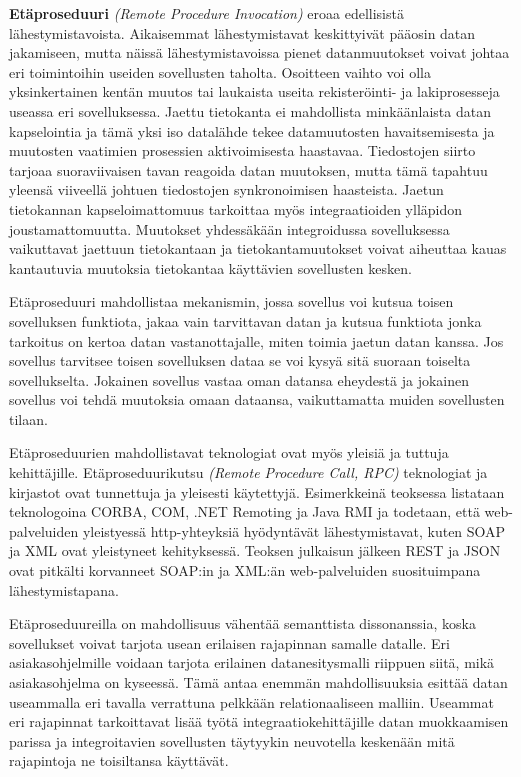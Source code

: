 \textbf{Etäproseduuri} \textit{(Remote Procedure Invocation)} eroaa edellisistä lähestymistavoista. Aikaisemmat lähestymistavat keskittyivät pääosin datan jakamiseen, mutta näissä lähestymistavoissa pienet datanmuutokset voivat johtaa eri toimintoihin useiden sovellusten taholta. Osoitteen vaihto voi olla yksinkertainen kentän muutos tai laukaista useita rekisteröinti- ja lakiprosesseja useassa eri sovelluksessa. Jaettu tietokanta ei mahdollista minkäänlaista datan kapselointia ja tämä yksi iso datalähde tekee datamuutosten havaitsemisesta ja muutosten vaatimien prosessien aktivoimisesta haastavaa. Tiedostojen siirto tarjoaa suoraviivaisen tavan reagoida datan muutoksen, mutta tämä tapahtuu yleensä viiveellä johtuen tiedostojen synkronoimisen haasteista.
Jaetun tietokannan kapseloimattomuus tarkoittaa myös integraatioiden ylläpidon joustamattomuutta. Muutokset yhdessäkään integroidussa sovelluksessa vaikuttavat jaettuun tietokantaan ja tietokantamuutokset voivat aiheuttaa kauas kantautuvia muutoksia tietokantaa käyttävien sovellusten kesken.

Etäproseduuri mahdollistaa mekanismin, jossa sovellus voi kutsua toisen sovelluksen funktiota, jakaa vain tarvittavan datan ja kutsua funktiota jonka tarkoitus on kertoa datan vastanottajalle, miten toimia jaetun datan kanssa.
Jos sovellus tarvitsee toisen sovelluksen dataa se voi kysyä sitä suoraan toiselta sovellukselta. 
Jokainen sovellus vastaa oman datansa eheydestä ja jokainen sovellus voi tehdä muutoksia omaan dataansa, vaikuttamatta muiden sovellusten tilaan.

Etäproseduurien mahdollistavat teknologiat ovat myös yleisiä ja tuttuja kehittäjille. Etäproseduurikutsu \textit{(Remote Procedure Call, RPC)} teknologiat ja kirjastot ovat tunnettuja ja yleisesti käytettyjä. Esimerkkeinä teoksessa \citep[sivu~71]{Hohpe2004} listataan teknologoina CORBA, COM, .NET Remoting ja Java RMI ja todetaan, että web-palveluiden yleistyessä http-yhteyksiä hyödyntävät lähestymistavat, kuten SOAP ja XML ovat yleistyneet kehityksessä. 
Teoksen julkaisun jälkeen REST ja JSON ovat pitkälti korvanneet SOAP:in ja XML:än web-palveluiden suosituimpana lähestymistapana.

Etäproseduureilla on mahdollisuus vähentää  semanttista dissonanssia, koska sovellukset voivat tarjota usean erilaisen rajapinnan samalle datalle. Eri asiakasohjelmille voidaan tarjota erilainen datanesitysmalli riippuen siitä, mikä asiakasohjelma on kyseessä. Tämä antaa enemmän mahdollisuuksia esittää datan useammalla eri tavalla verrattuna pelkkään relationaaliseen malliin.
Useammat eri rajapinnat tarkoittavat lisää työtä integraatiokehittäjille datan muokkaamisen parissa ja integroitavien sovellusten täytyykin neuvotella keskenään mitä rajapintoja ne toisiltansa käyttävät.

